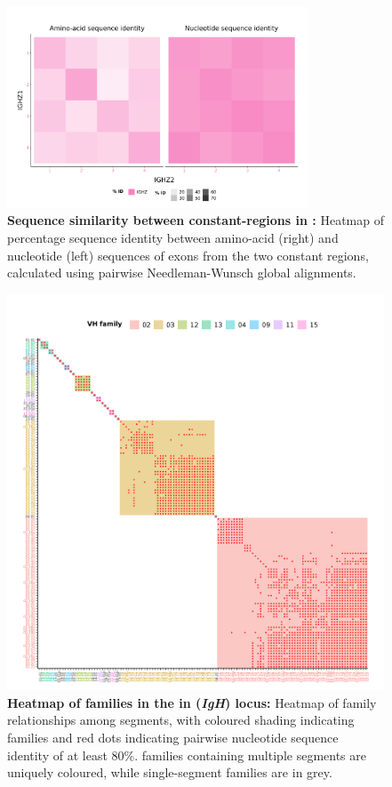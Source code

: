 \begin{figure}
	\centering
	\includegraphics[width=0.8\textwidth]{_Figures/png/xma-new-cz-aln}
	\caption[Sequence similarity between  constant-regions in \Xma]{\textbf{Sequence similarity between  constant-regions in \Xma:} Heatmap of percentage sequence identity between amino-acid (right) and nucleotide (left) sequences of \cz{} exons from the two \Xma {} constant regions, calculated using pairwise Needleman-Wunsch global alignments.} %
	\label{fig:xma-cz-aln}
\end{figure}

	\begin{figure}
	\centering
	\includegraphics[width=\textwidth]{_Figures/png/xma-vh-families-map}
	\caption[Heatmap of \vh families in the in \Xma \textit{IgH} locus]{\textbf{Heatmap of \vh families in the in \Xma (\textit{IgH}) locus:} Heatmap of family relationships among \Xma \vh segments, with coloured shading indicating families and red dots indicating pairwise nucleotide sequence identity of at least 80\%. \vh families containing multiple segments are uniquely coloured, while single-segment families are in grey.}
	\label{fig:xma-vh-families-map}
	\end{figure}

